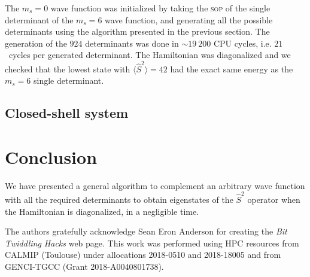 \documentclass[aip,jcp,reprint,showkeys]{revtex4-1}
\newcommand{\stwo}{\hat{S}^2}
\newcommand{\sop}{\textsc{sop}}
\begin{document}

The $m_s=0$ wave function was initialized by taking the {\sop} of the single determinant
of the $m_s=6$ wave function, and generating all the possible determinants using 
the algorithm presented in the previous section.
The generation of the $924$ determinants was done in $\sim 19~200$ CPU cycles,
i.e. $21$~cycles per generated determinant. The Hamiltonian was diagonalized and
we checked that the lowest state with $\langle \stwo \rangle = 42$ had the exact
same energy as the $m_s=6$ single determinant.


\subsection{Closed-shell system}


\section{Conclusion}

We have presented a general algorithm to complement an arbitrary wave function
with all the required determinants to obtain eigenstates of the $\stwo$
operator when the Hamiltonian is diagonalized, in a negligible time.


\begin{acknowledgments}
The authors gratefully acknowledge Sean Eron Anderson for creating the 
\emph{Bit Twiddling Hacks} web page.
This work was performed using HPC resources from CALMIP (Toulouse) under
allocations 2018-0510 and 2018-18005 and from GENCI-TGCC (Grant
2018-A0040801738).
\end{acknowledgments}



\end{document}
